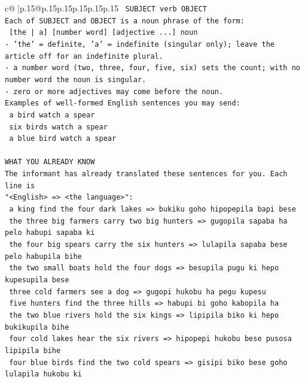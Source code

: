 \documentclass{article}
\begin{document}
{\begin{supertabular}{c@{$\;$}|p{.15\linewidth}@{}p{.15\linewidth}p{.15\linewidth}p{.15\linewidth}p{.15\linewidth}p{.15\linewidth}}
{{{\texttt{    SUBJECT  verb  OBJECT} \\
\texttt{Each of SUBJECT and OBJECT is a noun phrase of the form:} \\
\texttt{    {[}the | a{]}  {[}number word{]}  {[}adjective ...{]}  noun} \\
\texttt{{-} 'the' = definite, 'a' = indefinite (singular only); leave the article off for an indefinite plural.} \\
\texttt{{-} a number word (two, three, four, five, six) sets the count; with no number word the noun is singular.} \\
\texttt{{-} zero or more adjectives may come before the noun.} \\
\texttt{Examples of well{-}formed English sentences you may send:} \\
\texttt{    a bird watch a spear} \\
\texttt{    six birds watch a spear} \\
\texttt{    a blue bird watch a spear} \\
\\ 
\texttt{WHAT YOU ALREADY KNOW} \\
\texttt{The informant has already translated these sentences for you. Each line is} \\
\texttt{"<English>  =>  <the language>":} \\
\texttt{    a king find the four dark lakes  =>  bukiku goho hipopepila bapi bese} \\
\texttt{    the three big farmers carry two big hunters  =>  gugopila sapaba ha pelo habupi sapaba ki} \\
\texttt{    the four big spears carry the six hunters  =>  lulapila sapaba bese pelo habupila bihe} \\
\texttt{    the two small boats hold the four dogs  =>  besupila pugu ki hepo kupesupila bese} \\
\texttt{    three cold farmers see a dog  =>  gugopi hukobu ha pegu kupesu} \\
\texttt{    five hunters find the three hills  =>  habupi bi goho kabopila ha} \\
\texttt{    the two blue rivers hold the six kings  =>  lipipila biko ki hepo bukikupila bihe} \\
\texttt{    four cold lakes hear the six rivers  =>  hipopepi hukobu bese pusosa lipipila bihe} \\
\texttt{    four blue birds find the two cold spears  =>  gisipi biko bese goho lulapila hukobu ki} \\
}}}
\end{supertabular}}
\end{document}
